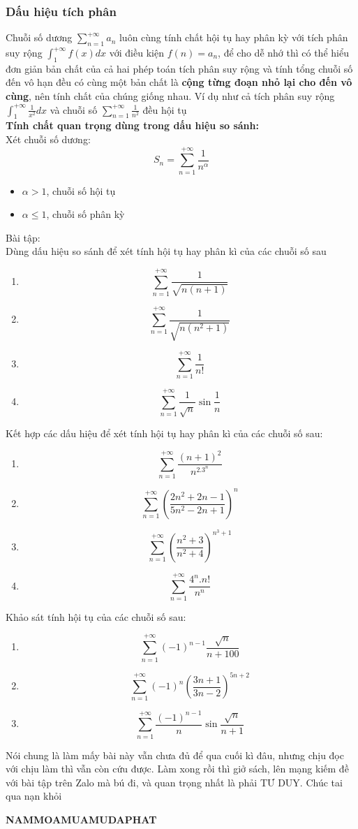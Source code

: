 \documentclass{article}
\begin{document}
\subsubsection{Dấu hiệu tích phân}
Chuỗi số dương $\sum_{n=1}^{+\infty}a_{n}$ luôn cùng tính chất hội tụ hay phân kỳ với tích phân suy rộng $\int_{1}^{+\infty}f(x)dx$ với điều kiện $f(n)=a_{n}$, để cho dễ nhớ thì có thể hiểu đơn giản bản chất của cả hai phép toán tích phân suy rộng và tính tổng chuỗi số đến vô hạn đều có cùng một bản chất là \textbf{cộng từng đoạn nhỏ lại cho đến vô cùng}, nên tính chất của chúng giống nhau. Ví dụ như cả tích phân suy rộng $\int_{1}^{+\infty}\frac{1}{x^2}dx$ và chuỗi số $\sum_{n=1}^{+\infty}\frac{1}{n^2}$ đều hội tụ
\\ \textbf{Tính chất quan trọng dùng trong dấu hiệu so sánh:}
\\ Xét chuỗi số dương: $$S_{n}=\sum_{n=1}^{+\infty}\frac{1}{n^\alpha}$$
\begin{itemize}
    \item $\alpha>1$, chuỗi số hội tụ
    \item $\alpha\leq 1$, chuỗi số phân kỳ
\end{itemize}
Bài tập:
\\ Dùng dấu hiệu so sánh để xét tính hội tụ hay phân kì của các chuỗi số sau
\begin{enumerate}
    \item $$\sum_{n=1}^{+\infty}\frac{1}{\sqrt{n(n+1)}}$$
    \item $$\sum_{n=1}^{+\infty}\frac{1}{\sqrt{n(n^2+1)}}$$
    \item $$\sum_{n=1}^{+\infty}\frac{1}{n!}$$
    \item $$\sum_{n=1}^{+\infty}\frac{1}{\sqrt{n}}\sin{\frac{1}{n}}$$
\end{enumerate}
Kết hợp các dấu hiệu để xét tính hội tụ hay phân kì của các chuỗi số sau:
\begin{enumerate}
    \item $$\sum_{n=1}^{+\infty}\frac{(n+1)^2}{n^2.3^n}$$
    \item $$\sum_{n=1}^{+\infty}\left(\frac{2n^2+2n-1}{5n^2-2n+1}\right)^n$$
    \item $$\sum_{n=1}^{+\infty}\left(\frac{n^2+3}{n^2+4}\right)^{n^3+1}$$
    \item $$\sum_{n=1}^{+\infty}\frac{4^n.n!}{n^n}$$
\end{enumerate}
Khảo sát tính hội tụ của các chuỗi số sau:
\begin{enumerate}
    \item $$\sum_{n=1}^{+\infty}(-1)^{n-1}\frac{\sqrt{n}}{n+100}$$
    \item $$\sum_{n=1}^{+\infty}(-1)^{n}\left(\frac{3n+1}{3n-2}\right)^{5n+2}$$
    \item $$\sum_{n=1}^{+\infty}\frac{(-1)^{n-1}}{n}\sin{\frac{\sqrt{n}}{n+1}}$$
\end{enumerate}
Nói chung là làm mấy bài này vẫn chưa đủ để qua cuối kì đâu, nhưng chịu đọc với chịu làm thì vẫn còn cứu được. Làm xong rồi thì giở sách, lên mạng kiếm đề với bài tập trên Zalo mà bú đi, và quan trọng nhất là phải TƯ DUY. Chúc tai qua nạn khỏi
\begin{center}
    \textbf{NAMMOAMUAMUDAPHAT}
    \end{center}
\end{document}
